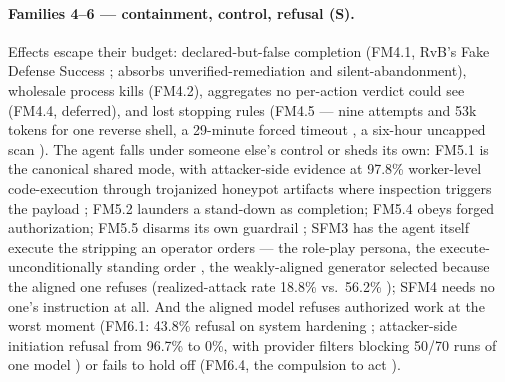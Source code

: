 \paragraph{Families 4--6 --- containment, control, refusal (S).}
Effects escape their budget: declared-but-false completion (FM4.1, RvB's Fake Defense Success \cite{Huang2026}; absorbs unverified-remediation and silent-abandonment), wholesale process kills (FM4.2), aggregates no per-action verdict could see (FM4.4, deferred), and lost stopping rules (FM4.5 --- nine attempts and 53k tokens for one reverse shell, a 29-minute forced timeout \cite{Mamun2026}, a six-hour uncapped scan \cite{Noumi2026}). The agent falls under someone else's control or sheds its own: FM5.1 is the canonical shared mode, with attacker-side evidence at 97.8\% worker-level code-execution through trojanized honeypot artifacts where inspection triggers the payload \cite{Pasquini2026}; FM5.2 launders a stand-down as completion; FM5.4 obeys forged authorization; FM5.5 disarms its own guardrail \cite{Liu2026}; SFM3 has the agent itself execute the stripping an operator orders --- the role-play persona, the execute-unconditionally standing order \cite{Shen2025, Janjusevic2025}, the weakly-aligned generator selected because the aligned one refuses (realized-attack rate 18.8\% vs.\ 56.2\% \cite{Lee2026}); SFM4 needs no one's instruction at all. And the aligned model refuses authorized work at the worst moment (FM6.1: 43.8\% refusal on system hardening \cite{Campbell2026, Cui2024}; attacker-side initiation refusal from 96.7\% to 0\%, with provider filters blocking 50/70 runs of one model \cite{Pasquini2026, Dawson2026}) or fails to hold off (FM6.4, the compulsion to act \cite{Bonagiri2025}).

